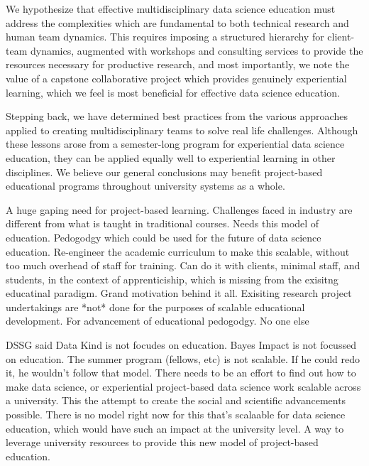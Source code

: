 \documentclass[12pt]{article}
\begin{document}
We hypothesize that effective multidisciplinary data science education must address the complexities which are fundamental to both technical research and human team dynamics. This requires imposing a structured hierarchy for client-team dynamics, augmented with workshops and consulting services to provide the resources necessary for productive research, and most importantly, we note the value of a capstone collaborative project which provides genuinely experiential learning, which we feel is most beneficial for effective data science education.

Stepping back, we have determined best practices from the various approaches applied to creating multidisciplinary teams to solve real life challenges.  Although these lessons arose from a semester-long program for experiential data science education, they can be applied equally well to experiential learning in other disciplines.  We believe our general conclusions may benefit project-based educational programs throughout university systems as a whole.



A huge gaping need for project-based learning.
Challenges faced in industry are different from what is taught in traditional courses.
Needs this model of education.
Pedogodgy which could be used for the future of data science education.
Re-engineer the academic curriculum to make this scalable, without too much overhead of staff for training.
Can do it with clients, minimal staff, and students, in the context of apprenticiship, which is missing from the exisitng educatinal paradigm.
Grand motivation behind it all.
Exisiting research project undertakings are *not* done for the purposes of scalable educational development.
For advancement of educational pedogodgy.
No one else 

DSSG said
Data Kind is not focudes on education.
Bayes Impact is not focussed on education.
The summer program (fellows, etc) is not scalable.
If he could redo it, he wouldn't follow that model.
There needs to be an effort to find out how to make data science, or experiential project-based data science work scalable across a university.
This the attempt to create the social and scientific advancements possible.
There is no model right now for this that's scalaable for data science education, which would have such an impact at the university level.  A way to leverage university resources to provide this new model of project-based education.  


\newpage

%
%

\newpage
\printbibliography
\end{document}
